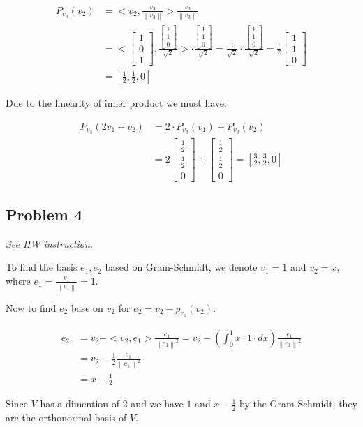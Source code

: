 \documentclass[11pt]{article}
\providecommand{\qbm}[1]{\begin{bmatrix} #1 \end{bmatrix}}
\providecommand{\norm}[1]{\left\lVert #1 \right\rVert}
\begin{document}
\begin{align*}
    P_{v_3}(v_2) &= < v_2, \frac{v_3}{\norm{v_3}} > \frac{v_3}{\norm{v_3}} \\
    &= < \qbm{1 \\ 0 \\ 1}, \frac{\qbm{1 \\ 1 \\ 0}}{\sqrt{2}} > \cdot \frac{\qbm{1 \\ 1 \\ 0}}{\sqrt{2}} = \frac{1}{\sqrt{2}} \cdot \frac{\qbm{1 \\ 1 \\ 0}}{\sqrt{2}} = \frac{1}{2} \qbm{1 \\ 1 \\ 0} \\
    &= [\frac{1}{2}, \frac{1}{2}, 0]
\end{align*}

Due to the linearity of inner product we must have:

\begin{align*}
    P_{v_3}(2 v_1 + v_2) &= 2 \cdot P_{v_3}(v_1) + P_{v_3}(v_2) \\
    &= 2 \qbm{\frac{1}{2} \\ \frac{1}{2} \\ 0} +  \qbm{\frac{1}{2} \\ \frac{1}{2} \\ 0 } = [\frac{3}{2}, \frac{3}{2}, 0]
\end{align*}

\subsection*{Problem 4}
\textit{See HW instruction.}\newline

To find the basis $e_1, e_2$ based on Gram-Schmidt, we denote $v_1 = 1$ and $v_2 = x$, where $e_1 = \frac{v_1}{\norm{v_1}} = 1$.

Now to find $e_2$ base on $v_2$ for $e_2 = v_2 - p_{e_1}(v_2)$:

\begin{align*}
    e_2 &= v_2 - <v_2, e_1>\frac{e_1}{\norm{e_1}^2} = v_2 - (\int_{0}^{1} x \cdot 1 \cdot dx)\frac{e_1}{\norm{e_1}^2} \\
    &= v_2 - \frac{1}{2}\frac{e_1}{\norm{e_1}^2} \\
    &= x - \frac{1}{2}
\end{align*}

Since $V$ has a dimention of 2 and we have $1$ and $x - \frac{1}{2}$ by the Gram-Schmidt, they are the orthonormal basis of $V$.
\end{document}
